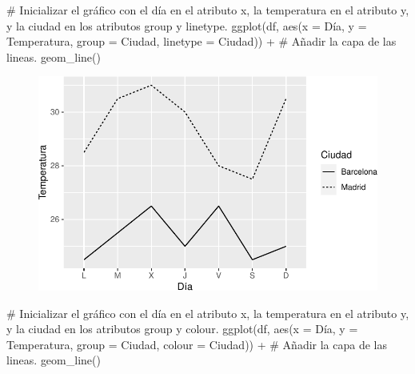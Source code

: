 \documentclass[
  a4paper,
]{scrreport}
\newenvironment{Shaded}{\begin{snugshade}}{\end{snugshade}}
\newcommand{\AttributeTok}[1]{\textcolor[rgb]{0.40,0.45,0.13}{#1}}
\newcommand{\CommentTok}[1]{\textcolor[rgb]{0.37,0.37,0.37}{#1}}
\newcommand{\FunctionTok}[1]{\textcolor[rgb]{0.28,0.35,0.67}{#1}}
\newcommand{\NormalTok}[1]{\textcolor[rgb]{0.00,0.23,0.31}{#1}}
\newcommand{\SpecialCharTok}[1]{\textcolor[rgb]{0.37,0.37,0.37}{#1}}
\theoremstyle{definition}
\theoremstyle{definition}
\theoremstyle{remark}
\begin{document}
\begin{Shaded}
\begin{Highlighting}[]
\CommentTok{\# Inicializar el gráfico con el día en el atributo x, la temperatura en el atributo y, y la ciudad en los atributos group y linetype.}
\FunctionTok{ggplot}\NormalTok{(df, }\FunctionTok{aes}\NormalTok{(}\AttributeTok{x =}\NormalTok{ Día, }\AttributeTok{y =}\NormalTok{ Temperatura, }\AttributeTok{group =}\NormalTok{ Ciudad, }\AttributeTok{linetype =}\NormalTok{ Ciudad)) }\SpecialCharTok{+}
\CommentTok{\# Añadir la capa de las lineas.}
    \FunctionTok{geom\_line}\NormalTok{()}
\end{Highlighting}
\end{Shaded}

\begin{figure}[H]

{\centering \includegraphics{07-graficos_files/figure-pdf/unnamed-chunk-7-1.pdf}

}

\end{figure}

\begin{Shaded}
\begin{Highlighting}[]
\CommentTok{\# Inicializar el gráfico con el día en el atributo x, la temperatura en el atributo y, y la ciudad en los atributos group y colour.}
\FunctionTok{ggplot}\NormalTok{(df, }\FunctionTok{aes}\NormalTok{(}\AttributeTok{x =}\NormalTok{ Día, }\AttributeTok{y =}\NormalTok{ Temperatura, }\AttributeTok{group =}\NormalTok{ Ciudad, }\AttributeTok{colour =}\NormalTok{ Ciudad)) }\SpecialCharTok{+}
\CommentTok{\# Añadir la capa de las lineas.}
    \FunctionTok{geom\_line}\NormalTok{()}
\end{Highlighting}
\end{Shaded}
\end{document}

